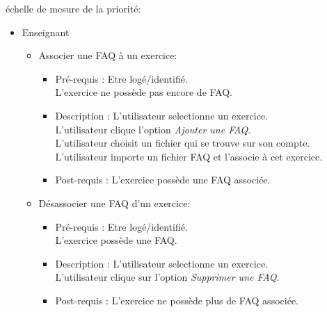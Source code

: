 \begin{center}
{\'e}chelle de mesure de la priorit{\'e}:

\end{center}


	\begin{itemize}
	\item Enseignant
		\begin{itemize}
		\item Associer une FAQ {\`a} un exercice:
			\begin{itemize}
			\item Pr{\'e}-requis : Etre log{\'e}/identifi{\'e}.\\
			L'exercice ne poss{\`e}de pas encore de FAQ.
			\item Description :  L'utilisateur selectionne un exercice.\\
			L'utilisateur clique l'option {\it Ajouter une FAQ}.\\
			L'utilisateur choisit un fichier qui se trouve sur son compte.
			L'utilisateur importe un fichier FAQ et l'associe {\`a} cet exercice.
			\item Post-requis : L'exercice poss{\`e}de une FAQ associ{\'e}e.
			\end{itemize}

		\item D{\'e}sassocier une FAQ d'un exercice:
			\begin{itemize}
			\item Pr{\'e}-requis : Etre log{\'e}/identifi{\'e}.\\
			L'exercice poss{\`e}de une FAQ.
			\item Description :  L'utilisateur selectionne un exercice.\\
			L'utilisateur clique sur l'option {\it Supprimer une FAQ}.
			\item Post-requis : L'exercice ne poss{\`e}de plus de FAQ associ{\'e}e.\\
			\end{itemize}
		\end{itemize}
	\end{itemize}

